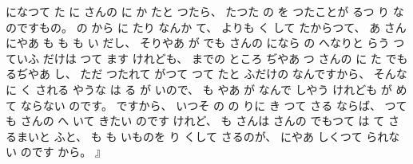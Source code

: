 になつて
た
に
さんの
%
に
か
たと
つたら、
%
たつた
の
を
つたことが
るつ
り
なのですもの。
%
の
から
に
たり
なんか
て、
%
よりも
く
して
たからつて、
%
あ
さんにやあ
も
も
も
い
だし、
%
そりやあ
が
でも
さんの
になら
の
へなりと
らう
つていふ
だけは
つて
ます
けれども、
%
までの
ところ
ぢやあ
つ
さんの
に
た
でも
るぢやあ
し、
%
ただ%
つたれて
がつて
つて
たと
ふだけの
なんですから、
%
そんなに
く
される
やうな
は
る
が
いので、
%
も
やあ
が
なんで
しやう
けれども
が
めて
ならない
のです。
%
ですから、
%
いつそ
の
の
りに
き
つて
さる
ならば、
%
つても
さんの
へ
いて
きたい
のです
けれど、
%
も
さんは
さんの
でもつて
は
て
さるまいと
ふと、
%
も
も
いものを
り
くして
さるのが、
%
にやあ
しくつて
られない
のです
から。
』

